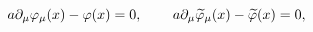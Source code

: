 \begin{equation}
a\partial _\mu \varphi _\mu (x)-\varphi (x)=0
,\hspace{0.3in}a\partial _\mu \widetilde{ \varphi }_\mu
(x)-\widetilde{\varphi }(x)=0 , \label{2}
\end{equation}

